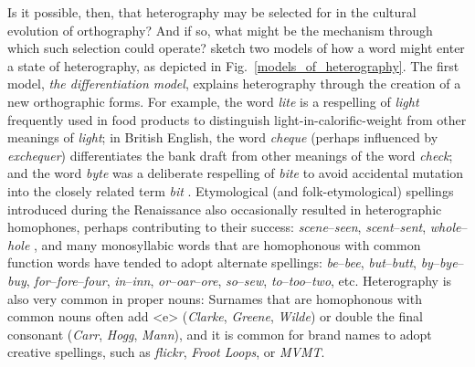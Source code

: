 \documentclass[doc,biblatex]{apa7}
\begin{document}
Is it possible, then, that heterography may be selected for in the cultural evolution of orthography? And if so, what might be the mechanism through which such selection could operate? \textcite[pp.~325--326]{Berg:2021} sketch two models of how a word might enter a state of heterography, as depicted in Fig.~\ref{models_of_heterography}. The first model, \textit{the differentiation model}, explains heterography through the creation of a new orthographic forms. For example, the word \textit{lite} is a respelling of \textit{light} frequently used in food products to distinguish light-in-calorific-weight from other meanings of \textit{light}; in British English, the word \textit{cheque} (perhaps influenced by \textit{exchequer}) differentiates the bank draft from other meanings of the word \textit{check}; and the word \textit{byte} was a deliberate respelling of \textit{bite} to avoid accidental mutation into the closely related term \textit{bit} \parencite{Buchholz:1977}. Etymological (and folk-etymological) spellings introduced during the Renaissance also occasionally resulted in heterographic homophones, perhaps contributing to their success: \textit{scene}--\textit{seen}, \textit{scent}--\textit{sent}, \textit{whole}--\textit{hole} \parencite[pp.~58--59]{Scragg:1974}, and many monosyllabic words that are homophonous with common function words have tended to adopt alternate spellings: \textit{be}--\textit{bee}, \textit{but}--\textit{butt}, \textit{by}--\textit{bye}--\textit{buy}, \textit{for}--\textit{fore}--\textit{four}, \textit{in}--\textit{inn}, \textit{or}--\textit{oar}--\textit{ore}, \textit{so}--\textit{sew}, \textit{to}--\textit{too}--\textit{two}, etc. Heterography is also very common in proper nouns: Surnames that are homophonous with common nouns often add <e> (\textit{Clarke}, \textit{Greene}, \textit{Wilde}) or double the final consonant (\textit{Carr}, \textit{Hogg}, \textit{Mann}), and it is common for brand names to adopt creative spellings, such as \textit{flickr}, \textit{Froot Loops}, or \textit{MVMT}.
\end{document}
